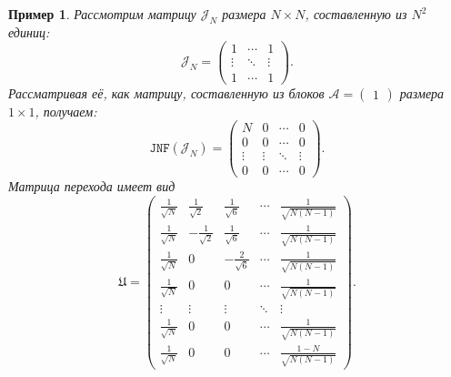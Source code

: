 \documentclass[a4paper]{article}
\newtheorem{example}{Пример}
\begin{document}
 \begin{example}
     Рассмотрим матрицу \( \mathcal{J}_N \) размера \( N\times N \), составленную из \( N^2 \) единиц:
     \[ \mathcal{J}_N =
        \begin{pmatrix}
            1 & \cdots & 1 \\
            \vdots & \ddots & \vdots \\
            1 & \cdots & 1
        \end{pmatrix}. \]
     Рассматривая её, как матрицу, составленную из блоков \( \mathcal{A}=\begin{pmatrix} 1 \end{pmatrix} \)
     размера \( 1\times 1 \), получаем:
     \[
         \mathtt{JNF}(\mathcal{J}_N) =
         \left(
         \begin{array}{c|ccc}
             N & 0 & \cdots & 0 \\ \hline
             0 & 0 & \cdots & 0 \\
             \vdots & \vdots  & \ddots & \vdots \\
             0 & 0 & \cdots & 0
         \end{array}\right). \]
     Матрица перехода имеет вид
     \[
         \mathfrak{U} = 
            \begin{pmatrix}
                \frac{1}{\sqrt N} &  \frac{1}{\sqrt2} &  \frac{1}{\sqrt{6}} & \cdots & \frac{1}{\sqrt{N(N-1)}} \\
                \frac{1}{\sqrt N} & -\frac{1}{\sqrt2} &  \frac{1}{\sqrt{6}} & \cdots & \frac{1}{\sqrt{N(N-1)}} \\
                \frac{1}{\sqrt N} & 0                 & -\frac{2}{\sqrt{6}} & \cdots & \frac{1}{\sqrt{N(N-1)}} \\
                \frac{1}{\sqrt N} & 0                 &  0                  & \cdots & \frac{1}{\sqrt{N(N-1)}} \\
                \vdots            & \vdots            &  \vdots             & \ddots & \vdots \\
                \frac{1}{\sqrt N} & 0                 &  0                  & \cdots & \frac{1}{\sqrt{N(N-1)}} \\
                \frac{1}{\sqrt N} & 0                 &  0                  & \cdots & \frac{1-N}{\sqrt{N(N-1)}}
            \end{pmatrix}.
         \]
 \end{example}
\end{document}
